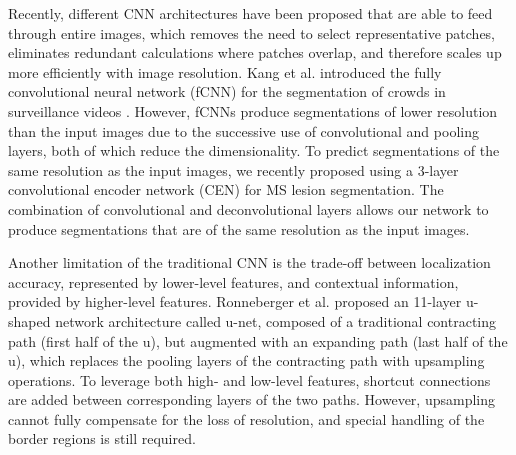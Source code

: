 
Recently, different CNN architectures
\cite{ronneberger2015,brosch2015,kang2014fully} have been proposed that are able
to feed through entire images, which removes the need to select representative
patches, eliminates redundant calculations where patches overlap, and therefore
scales up more efficiently with image resolution. Kang et al. introduced the
fully convolutional neural network (fCNN) for the segmentation of crowds in
surveillance videos \cite{kang2014fully}. However, fCNNs produce segmentations
of lower resolution than the input images due to the successive use of
convolutional and pooling layers, both of which reduce the dimensionality.
To predict segmentations of the same resolution as the input images, we recently
proposed using a 3-layer convolutional encoder network (CEN) \cite{brosch2015}
for MS lesion segmentation. The combination of convolutional \cite{LeCun1998}
and deconvolutional \cite{zeiler2011} layers allows our network to produce
segmentations that are of the same resolution as the input images. 

Another limitation of the traditional CNN is the trade-off between localization
accuracy, represented by lower-level features, and contextual information,
provided by higher-level features.
%
Ronneberger et al. \cite{ronneberger2015}
%
%
proposed an 11-layer u-shaped network architecture called u-net,
composed of a traditional contracting path (first half of the u), but augmented
with an expanding path (last half of the u), which replaces the pooling layers
of the contracting path with upsampling operations. To leverage both high- and
low-level features, shortcut connections are added between corresponding layers
of the two paths.
However,
upsampling cannot fully compensate for the loss of resolution, and special
handling of the border regions is still required.

